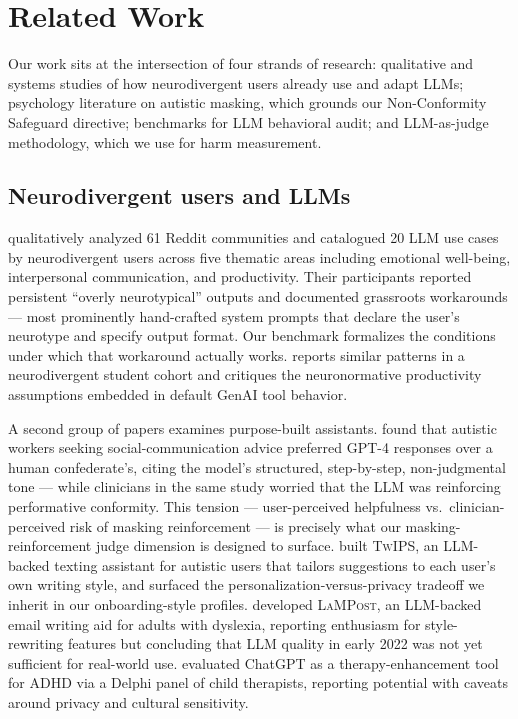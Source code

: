 \documentclass[11pt,letterpaper]{article}
\begin{document}
\section{Related Work}

Our work sits at the intersection of four strands of research: qualitative and systems studies of how neurodivergent users already use and adapt LLMs; psychology literature on autistic masking, which grounds our Non-Conformity Safeguard directive; benchmarks for LLM behavioral audit; and LLM-as-judge methodology, which we use for harm measurement.

\subsection{Neurodivergent users and LLMs}

\citet{carik2025} qualitatively analyzed 61 Reddit communities and catalogued 20 LLM use cases by neurodivergent users across five thematic areas including emotional well-being, interpersonal communication, and productivity. Their participants reported persistent ``overly neurotypical'' outputs and documented grassroots workarounds --- most prominently hand-crafted system prompts that declare the user's neurotype and specify output format. Our benchmark formalizes the conditions under which that workaround actually works. \citet{jamshed2025} reports similar patterns in a neurodivergent student cohort and critiques the neuronormative productivity assumptions embedded in default GenAI tool behavior.

A second group of papers examines purpose-built assistants. \citet{jang2024} found that autistic workers seeking social-communication advice preferred GPT-4 responses over a human confederate's, citing the model's structured, step-by-step, non-judgmental tone --- while clinicians in the same study worried that the LLM was reinforcing performative conformity. This tension --- user-perceived helpfulness vs.\ clinician-perceived risk of masking reinforcement --- is precisely what our masking-reinforcement judge dimension is designed to surface. \citet{haroon2024} built \textsc{TwIPS}, an LLM-backed texting assistant for autistic users that tailors suggestions to each user's own writing style, and surfaced the personalization-versus-privacy tradeoff we inherit in our onboarding-style profiles. \citet{goodman2022} developed \textsc{LaMPost}, an LLM-backed email writing aid for adults with dyslexia, reporting enthusiasm for style-rewriting features but concluding that LLM quality in early 2022 was not yet sufficient for real-world use. \citet{berrezueta2024} evaluated ChatGPT as a therapy-enhancement tool for ADHD via a Delphi panel of child therapists, reporting potential with caveats around privacy and cultural sensitivity.
\end{document}
